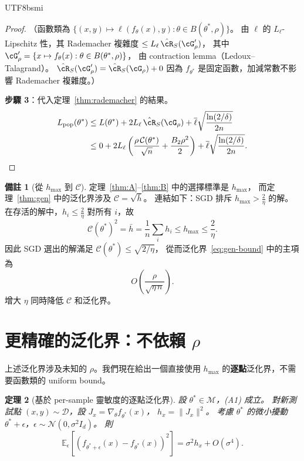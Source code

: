\documentclass[11pt,a4paper]{article}
\newtheorem{theorem}{定理}
\theoremstyle{definition}
\newtheorem{remark}[theorem]{備註}
\newcommand{\E}{\mathbb{E}}
\newcommand{\cM}{\mathcal{M}}
\newcommand{\cD}{\mathcal{D}}
\newcommand{\cC}{\mathcal{C}}
\begin{document}
\begin{CJK}{UTF8}{bsmi}
\begin{proof}
  （函數類為 $\{(x,y)\mapsto\ell(f_\theta(x),y):\theta\in B(\theta^*,\rho)\}$。
  由 $\ell$ 的 $L_\ell$-Lipschitz 性，其 Rademacher 複雜度
  $\leq L_\ell\,\hat{\cR}_S(\cG_\rho')$，
  其中 $\cG_\rho'=\{x\mapsto f_\theta(x):\theta\in B(\theta^*,\rho)\}$，
  由 contraction lemma（Ledoux--Talagrand）。
  $\hat{\cR}_S(\cG_\rho')=\hat{\cR}_S(\cG_\rho)+0$
  因為 $f_{\theta^*}$ 是固定函數，加減常數不影響 Rademacher 複雜度。）

  \textbf{步驟 3}：代入定理~\ref{thm:rademacher} 的結果。
  \begin{align*}
    L_{\mathrm{pop}}(\theta^*)
    &\leq L(\theta^*) + 2L_\ell\,\hat{\cR}_S(\cG_\rho) + \overline{\ell}\sqrt{\frac{\ln(2/\delta)}{2n}}\\
    &\leq 0 + 2L_\ell\left(\frac{\rho\,\cC(\theta^*)}{\sqrt{n}}+\frac{B_2\rho^2}{2}\right)
    + \overline{\ell}\sqrt{\frac{\ln(2/\delta)}{2n}}. \qedhere
  \end{align*}
\end{proof}

\begin{remark}[從 $h_{\max}$ 到 $\cC$]
  定理~\ref{thm:A}--\ref{thm:B} 中的選擇標準是 $h_{\max}$，
  而定理~\ref{thm:gen} 中的泛化界涉及 $\cC=\sqrt{\bar{h}}$。
  連結如下：SGD 排斥 $h_{\max}>\frac{2}{\eta}$ 的解。
  在存活的解中，$h_i\leq\frac{2}{\eta}$ 對所有 $i$，故
  \[
    \cC(\theta^*)^2 = \bar{h} = \frac{1}{n}\sum_i h_i \leq h_{\max} \leq \frac{2}{\eta}.
  \]
  因此 SGD 選出的解滿足 $\cC(\theta^*)\leq\sqrt{2/\eta}$，
  從而泛化界~\eqref{eq:gen-bound} 中的主項為
  \[
    O\!\left(\frac{\rho}{\sqrt{\eta\,n}}\right).
  \]
  增大 $\eta$ 同時降低 $\cC$ 和泛化界。
\end{remark}

\section{更精確的泛化界：不依賴 $\rho$}

上述泛化界涉及未知的 $\rho$。我們現在給出一個直接使用 $h_{\max}$
的\textbf{逐點}泛化界，不需要函數類的 uniform bound。

\begin{theorem}[基於 per-sample 靈敏度的逐點泛化界]\label{thm:pointwise-gen}
  設 $\theta^*\in\cM$，(A1) 成立。
  對新測試點 $(x,y)\sim\cD$，設 $J_x=\nabla_\theta f_{\theta^*}(x)$，
  $h_x=\|J_x\|^2$。
  考慮 $\theta^*$ 的微小擾動 $\theta^*+\epsilon$，$\epsilon\sim\mathcal{N}(0,\sigma^2 I_d)$。
  則
  \[
    \E_\epsilon[(f_{\theta^*+\epsilon}(x)-f_{\theta^*}(x))^2] = \sigma^2 h_x + O(\sigma^4).
  \]


\end{theorem}
\end{CJK}
\end{document}
